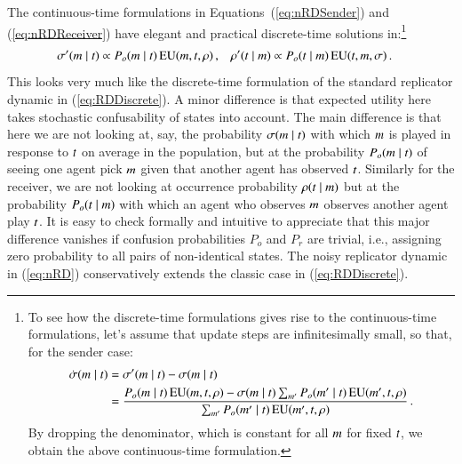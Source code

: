 \documentclass[fleqn,reqno,10pt]{article}
\begin{document}
The continuous-time formulations in Equations~(\ref{eq:nRDSender}) and (\ref{eq:nRDReceiver})
have elegant and practical discrete-time solutions in:\footnote{To see how the discrete-time
  formulations gives rise to the continuous-time formulations, let's assume that update steps are
  infinitesimally small, so that, for the sender case:
  \begin{align*}
    \dot{\sigma}(m \mid t) & = \sigma'(m \mid t) - \sigma(m
    \mid t)\\ 
    &= \frac{P_o(m \mid t) \thinspace \mathrm{EU}(m, t, \rho)
      - \sigma(m \mid t) \sum_{m'} P_o(m' \mid t) \thinspace
      \mathrm{EU}(m', t, \rho) }{ \sum_{m'} P_o(m' \mid t) \thinspace
      \mathrm{EU}(m', t, \rho)}\,.
  \end{align*}
By dropping the denominator, which is constant for all $m$ for fixed
$t$, we obtain the above continuous-time formulation.}
\begin{align}
  \label{eq:nRD}
  \sigma'(m \mid t) & \propto P_o(m \mid t) \thinspace \mathrm{EU}(m,
  t, \rho)\,, & \rho'(t \mid m) & \propto P_o(t \mid m)
  \thinspace \mathrm{EU}(t, m, \sigma)\,.
\end{align}
This looks very much like the discrete-time formulation of the standard replicator dynamic in
(\ref{eq:RDDiscrete}). A minor difference is that expected utility here takes stochastic
confusability of states into account. The main difference is that here we are not looking at,
say, the probability $\sigma(m \mid t)$ with which $m$ is played in
response to $t$ on average in the population, but at the probability $P_o(m \mid
t)$ of seeing one agent pick $m$ given that another agent has observed
$t$. Similarly for the receiver, we are not looking at occurrence probability
$\rho(t \mid m)$ but at the probability $P_o(t \mid m)$ with
which an agent who observes $m$ observes another agent play $t$. It is easy to check
formally and intuitive to appreciate that this major difference vanishes if confusion
probabilities $P_o$ and $P_r$ are trivial, i.e., assigning zero probability to all pairs of
non-identical states. The noisy replicator dynamic in (\ref{eq:nRD}) conservatively extends the
classic case in (\ref{eq:RDDiscrete}). 


\printbibliography[heading=bibintoc]
\end{document}
